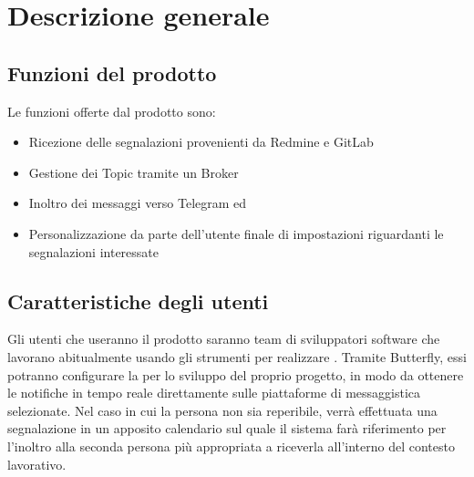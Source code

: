 \newpage
\section{Descrizione generale}\label{DescrizioneGenerale}

	
	\subsection{Funzioni del prodotto}
	
    Le funzioni offerte dal prodotto sono:
    \begin{itemize}
        \item Ricezione delle segnalazioni provenienti da Redmine e GitLab
        \item Gestione dei Topic tramite un Broker
        \item Inoltro dei messaggi verso Telegram ed \mail
        \item Personalizzazione da parte dell'utente finale di impostazioni riguardanti le segnalazioni interessate
	\end{itemize}

	\subsection{Caratteristiche degli utenti}
    
    Gli utenti che useranno il prodotto saranno team di sviluppatori software che lavorano abitualmente usando gli strumenti per realizzare .
    Tramite Butterfly, essi potranno configurare la  per lo sviluppo del proprio progetto, in modo da ottenere le notifiche in tempo reale direttamente sulle piattaforme di messaggistica selezionate.
    Nel caso in cui la persona non sia reperibile, verrà effettuata una segnalazione in un apposito calendario sul quale il sistema farà riferimento per l'inoltro alla seconda persona più appropriata a riceverla all'interno del contesto lavorativo.

